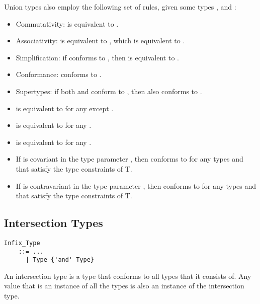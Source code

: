 Union types also employ the following set of rules, given some types ,  and :
\begin{itemize}
  \item Commutativity:  is equivalent to . 
  \item Associativity:  is equivalent to , which is equivalent to . 
  \item Simplification: if  conforms to , then  is equivalent to . 
  \item Conformance:  conforms to . 
  \item Supertypes: if both  and  conform to , then  also conforms to . 
  
  \item {} is equivalent to  for any  except . 
  \item {} is equivalent to  for any . 
  \item {} is equivalent to  for any . 
  
  \item If  is covariant in the type parameter , then  conforms to  for any types  and  that satisfy the type constraints of T. 
  \item If  is contravariant in the type parameter , then  conforms to  for any types  and  that satisfy the type constraints of T. 
\end{itemize}





\subsection{Intersection Types}
\label{sec:intersection-types}

\grammar\begin{lstlisting}
Infix_Type 
    ::= ...
      | Type {'and' Type}
\end{lstlisting}

An intersection type is a type that conforms to all types that it consists of. Any value that is an instance of all the types is also an instance of the intersection type. 

